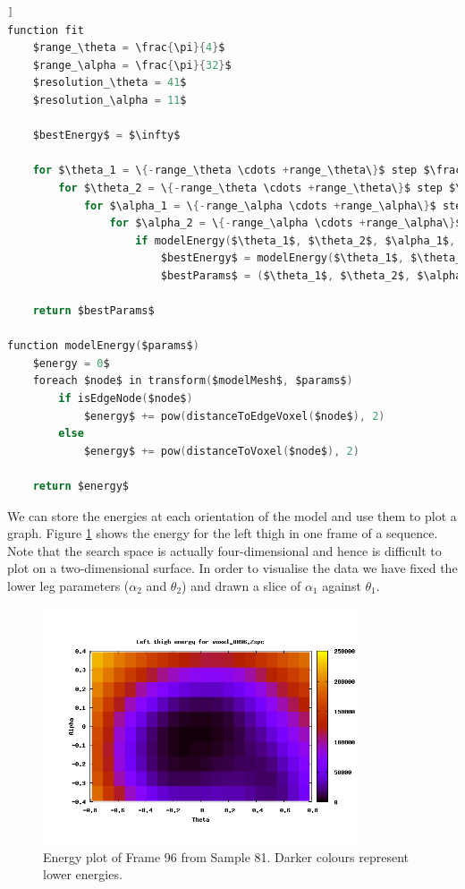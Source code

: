 \begin{lstlisting}[language=c,morekeywords={step,function,foreach,in},frame=single,mathescape=true,caption={Least squares fitting pseudo-code},label={leastsquarescode},float=[tb]]
function fit
	$range_\theta = \frac{\pi}{4}$
	$range_\alpha = \frac{\pi}{32}$
	$resolution_\theta = 41$
	$resolution_\alpha = 11$
	
	$bestEnergy$ = $\infty$
	
	for $\theta_1 = \{-range_\theta \cdots +range_\theta\}$ step $\frac{2range_\theta}{resolution_\theta}$
		for $\theta_2 = \{-range_\theta \cdots +range_\theta\}$ step $\frac{2range_\theta}{resolution_\theta}$
			for $\alpha_1 = \{-range_\alpha \cdots +range_\alpha\}$ step $\frac{2range_\alpha}{resolution_\alpha}$
				for $\alpha_2 = \{-range_\alpha \cdots +range_\alpha\}$ step $\frac{2range_\alpha}{resolution_\alpha}$
					if modelEnergy($\theta_1$, $\theta_2$, $\alpha_1$, $\alpha_2$) < $bestEnergy$
						$bestEnergy$ = modelEnergy($\theta_1$, $\theta_2$, $\alpha_1$, $\alpha_2$)
						$bestParams$ = ($\theta_1$, $\theta_2$, $\alpha_1$, $\alpha_2$)
	
	return $bestParams$

function modelEnergy($params$)
	$energy = 0$
	foreach $node$ in transform($modelMesh$, $params$)
		if isEdgeNode($node$)
			$energy$ += pow(distanceToEdgeVoxel($node$), 2)
		else
			$energy$ += pow(distanceToVoxel($node$), 2)
	
	return $energy$
\end{lstlisting}

We can store the energies at each orientation of the model and use them to plot a graph.
Figure \ref{EnergyPlot} shows the energy for the left thigh in one frame of a sequence.
Note that the search space is actually four-dimensional and hence is difficult to plot on a two-dimensional surface.
In order to visualise the data we have fixed the lower leg parameters ($\alpha_2$ and $\theta_2$) and drawn a slice of $\alpha_1$ against $\theta_1$.

\begin{figure}[tb]
	\centering
	\includegraphics[height=7cm]{problems/set81frame96-fixed-leftthigh.png}
	\caption{Energy plot of Frame 96 from Sample 81.
		Darker colours represent lower energies.}
	\label{EnergyPlot}
\end{figure}

